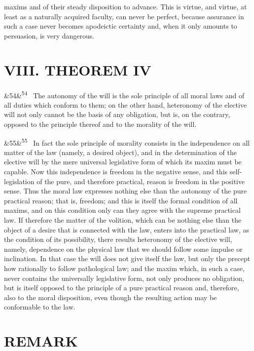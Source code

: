 \documentclass[12pt]{article}
\newcommand{\para}[1][]{\par\noindent\ifx&#1&\else\textsuperscript{\footnotesize #1}~\fi}
\begin{document}
maxims and of their steady disposition to advance. This is virtue, and virtue, at least as a naturally acquired faculty, can never be perfect, because assurance in such a case never becomes apodeictic certainty and, when it only amounts to persuasion, is very dangerous.

\section*{VIII. THEOREM IV}

\para[54] The autonomy of the will is the sole principle of all moral laws and of all duties which conform to them; on the other hand, heteronomy of the elective will not only cannot be the basis of any obligation, but is, on the contrary, opposed to the principle thereof and to the morality of the will.

\para[55] In fact the sole principle of morality consists in the independence on all matter of the law (namely, a desired object), and in the determination of the elective will by the mere universal legislative form of which its maxim must be capable. Now this independence is freedom in the negative sense, and this self-legislation of the pure, and therefore practical, reason is freedom in the positive sense. Thus the moral law expresses nothing else than the autonomy of the pure practical reason; that is, freedom; and this is itself the formal condition of all maxims, and on this condition only can they agree with the supreme practical law. If therefore the matter of the volition, which can be nothing else than the object of a desire that is connected with the law, enters into the practical law, as the condition of its possibility, there results heteronomy of the elective will, namely, dependence on the physical law that we should follow some impulse or inclination. In that case the will does not give itself the law, but only the precept how rationally to follow pathological law; and the maxim which, in such a case, never contains the universally legislative form, not only produces no obligation, but is itself opposed to the principle of a pure practical reason and, therefore, also to the moral disposition, even though the resulting action may be conformable to the law.

\section*{REMARK}
\end{document}
